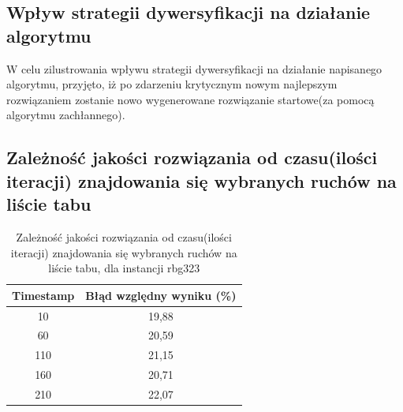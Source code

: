 \documentclass{article}
\begin{document}
\subsection{Wpływ strategii dywersyfikacji na działanie algorytmu}
\begin{figure}[H]
\end{figure}
\newpage
\par W celu zilustrowania wpływu strategii dywersyfikacji na działanie napisanego algorytmu, przyjęto, iż po zdarzeniu krytycznym nowym najlepszym rozwiązaniem zostanie nowo wygenerowane rozwiązanie startowe(za pomocą algorytmu zachłannego).

\subsection{Zależność jakości rozwiązania od czasu(ilości iteracji) znajdowania się wybranych ruchów na liście tabu}
\begin{table}[H]
	\centering
	
	\begin{tabular}{|c|c|}
		\hline
		\multicolumn{1}{|c|}{\textbf{Timestamp}} & \textbf{Błąd względny wyniku (\%)}  \\ \hline
		{10}                                	& 19,88               \\ \hline
		{60}                                & 20,59               \\ \hline
		{110}                                & 21,15                \\ \hline
		{160}                                & 20,71                 \\ \hline
		{210}                                & 22,07                 \\ \hline
	\end{tabular}
	\caption{Zależność jakości rozwiązania od czasu(ilości iteracji) znajdowania się wybranych ruchów na liście tabu, dla instancji rbg323}
\end{table}	
\end{document}
